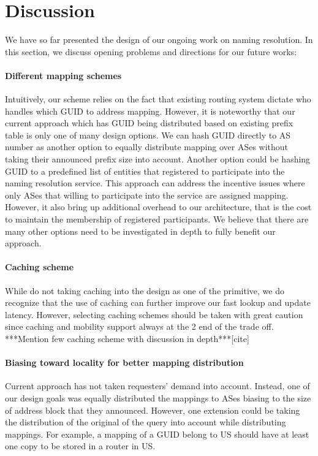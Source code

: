 \section{Discussion}
\label{sec:discussion}
We have so far presented the design of our ongoing work on naming resolution. In this section, we discuss opening problems and directions for our future works:

\paragraph{Different mapping schemes}
        Intuitively, our scheme relies on the fact that existing routing system dictate who handles which GUID to address mapping. However, it is noteworthy that our current approach which has GUID being distributed based on existing prefix table is only one of many design options. We can hash GUID directly to AS number as another option to equally distribute mapping over ASes without taking their announced prefix size into account.
        Another option could be hashing GUID to a predefined list of entities that registered to participate into the naming resolution service. This approach can address the incentive issues where only ASes that willing to participate into the service are assigned mapping. However, it also bring up additional overhead to our architecture, that is the cost to  maintain the membership of registered participants.
        We believe that there are many other options need to be investigated in depth to fully benefit our approach.

\paragraph{Caching scheme}
        While do not taking caching into the design as one of the primitive, we do recognize that the use of caching can further improve our fast lookup and update latency. However, selecting caching schemes should be taken with great caution since caching and mobility support always at the 2 end of the trade off. ***Mention few caching scheme with discussion in depth***[cite]


\paragraph{Biasing toward locality for better mapping distribution}
        Current approach has not taken requesters' demand into account. Instead, one of our design goals was equally distributed the mappings to ASes biasing to the size of address block that they announced. However, one extension could be taking the distribution of the original of the query into account while distributing mappings. For example, a mapping of a GUID belong to US should have at least one copy to be stored in a router in US.

